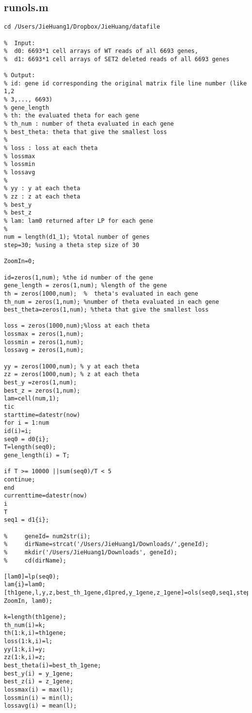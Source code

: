 \documentclass{article}
\begin{document}
\subsection{runols.m} \label{runols}
\begin{lstlisting}[frame=single]
cd /Users/JieHuang1/Dropbox/JieHuang/datafile 

%  Input: 
%  d0: 6693*1 cell arrays of WT reads of all 6693 genes,
%  d1: 6693*1 cell arrays of SET2 deleted reads of all 6693 genes

% Output:
% id: gene id corresponding the original matrix file line number (like 1,2
% 3,..., 6693)
% gene_length
% th: the evaluated theta for each gene
% th_num : number of theta evaluated in each gene
% best_theta: theta that give the smallest loss
% 
% loss : loss at each theta
% lossmax 
% lossmin 
% lossavg
% 
% yy : y at each theta
% zz : z at each theta
% best_y 
% best_z 
% lam: lam0 returned after LP for each gene
%  
num = length(d1_1); %total number of genes
step=30; %using a theta step size of 30

ZoomIn=0;

id=zeros(1,num); %the id number of the gene
gene_length = zeros(1,num); %length of the gene
th = zeros(1000,num);  %  theta's evaluated in each gene
th_num = zeros(1,num); %number of theta evaluated in each gene
best_theta=zeros(1,num); %theta that give the smallest loss

loss = zeros(1000,num);%loss at each theta
lossmax = zeros(1,num);
lossmin = zeros(1,num);
lossavg = zeros(1,num);

yy = zeros(1000,num); % y at each theta
zz = zeros(1000,num); % z at each theta
best_y =zeros(1,num); 
best_z = zeros(1,num);
lam=cell(num,1);
tic
starttime=datestr(now)
for i = 1:num 
id(i)=i;
seq0 = d0{i};
T=length(seq0);
gene_length(i) = T;

if T >= 10000 ||sum(seq0)/T < 5
continue; 
end
currenttime=datestr(now)
i
T
seq1 = d1{i};

%     geneId= num2str(i);
%     dirName=strcat('/Users/JieHuang1/Downloads/',geneId);
%     mkdir('/Users/JieHuang1/Downloads', geneId);
%     cd(dirName);

[lam0]=lp(seq0);
lam{i}=lam0;
[th1gene,l,y,z,best_th_1gene,d1pred,y_1gene,z_1gene]=ols(seq0,seq1,step, ZoomIn, lam0);

k=length(th1gene);
th_num(i)=k;
th(1:k,i)=th1gene;
loss(1:k,i)=l;
yy(1:k,i)=y;
zz(1:k,i)=z;
best_theta(i)=best_th_1gene;
best_y(i) = y_1gene;
best_z(i) = z_1gene;
lossmax(i) = max(l);
lossmin(i) = min(l);
lossavg(i) = mean(l);


\end{lstlisting}
\end{document}
